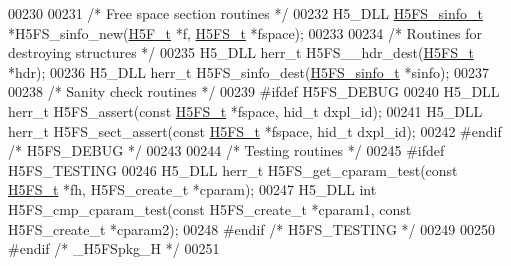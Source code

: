 \begin{DoxyCode}
00230 
00231 \textcolor{comment}{/* Free space section routines */}
00232 H5\_DLL \hyperlink{struct_h5_f_s__sinfo__t}{H5FS\_sinfo\_t} *H5FS\_sinfo\_new(\hyperlink{struct_h5_f__t}{H5F\_t} *f, \hyperlink{struct_h5_f_s__t}{H5FS\_t} *fspace);
00233 
00234 \textcolor{comment}{/* Routines for destroying structures */}
00235 H5\_DLL herr\_t H5FS\_\_hdr\_dest(\hyperlink{struct_h5_f_s__t}{H5FS\_t} *hdr);
00236 H5\_DLL herr\_t H5FS\_sinfo\_dest(\hyperlink{struct_h5_f_s__sinfo__t}{H5FS\_sinfo\_t} *sinfo);
00237 
00238 \textcolor{comment}{/* Sanity check routines */}
00239 \textcolor{preprocessor}{#ifdef H5FS\_DEBUG}
00240 H5\_DLL herr\_t H5FS\_assert(\textcolor{keyword}{const} \hyperlink{struct_h5_f_s__t}{H5FS\_t} *fspace, hid\_t dxpl\_id);
00241 H5\_DLL herr\_t H5FS\_sect\_assert(\textcolor{keyword}{const} \hyperlink{struct_h5_f_s__t}{H5FS\_t} *fspace, hid\_t dxpl\_id);
00242 \textcolor{preprocessor}{#endif }\textcolor{comment}{/* H5FS\_DEBUG */}\textcolor{preprocessor}{}
00243 
00244 \textcolor{comment}{/* Testing routines */}
00245 \textcolor{preprocessor}{#ifdef H5FS\_TESTING}
00246 H5\_DLL herr\_t H5FS\_get\_cparam\_test(\textcolor{keyword}{const} \hyperlink{struct_h5_f_s__t}{H5FS\_t} *fh, H5FS\_create\_t *cparam);
00247 H5\_DLL \textcolor{keywordtype}{int} H5FS\_cmp\_cparam\_test(\textcolor{keyword}{const} H5FS\_create\_t *cparam1, \textcolor{keyword}{const} H5FS\_create\_t *cparam2);
00248 \textcolor{preprocessor}{#endif }\textcolor{comment}{/* H5FS\_TESTING */}\textcolor{preprocessor}{}
00249 
00250 \textcolor{preprocessor}{#endif }\textcolor{comment}{/* \_H5FSpkg\_H */}\textcolor{preprocessor}{}
00251 
\end{DoxyCode}
